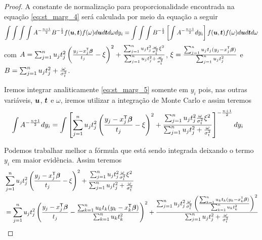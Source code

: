 \begin{proof}
A constante de normalização para proporcionalidade encontrada na equação \eqref{eq:st_marg_4} será calculada por meio da equação a seguir
\begin{equation}\label{eq:st_marg_5}
\int\int\int \int A^{-\frac{n-1}{2}} B^{-\frac{1}{2}} f({\boldsymbol{u}},{\boldsymbol{t}})f(\omega)d{\boldsymbol{u}} d{\boldsymbol{t}} d\omega d y_i  =  \int\int\int B^{-\frac{1}{2}}\left[ \int A^{-\frac{n-1}{2}}d y_i \right]f({\boldsymbol{u}},{\boldsymbol{t}})f(\omega)d{\boldsymbol{u}} d{\boldsymbol{t}} d\omega 
\end{equation}
com $A=\sum_{j=1}^nu_jt_j^2\left(\frac{y_j-x_j^{\mathsf{T}}{\boldsymbol{\beta}}}{t_j} - \xi\right)^2 + \frac{\sum_{j=1}^nu_jt_j^2\frac{\omega}{\sigma^2_t}\xi^2}{\sum_{j=1}^nu_jt_j^2+\frac{\omega}{\sigma^2_t}}$, $\xi = \frac{\sum_{j=1}^nu_jt_j(y_j-x_j^{\mathsf{T}}{\boldsymbol{\beta}})}{\sum_{j=1}^nu_jt_j^2}$ e $B=\sum_{j=1}^nu_jt_j^2+\frac{\omega}{\sigma^2_t}$.

Iremos integrar analiticamente \eqref{eq:st_marg_5} somente em $y_i$ pois, nas outras variáveis, ${\boldsymbol{u}}$, ${\boldsymbol{t}}$ e $\omega$, iremos utilizar a integração de Monte Carlo e assim teremos
\begin{equation}
\begin{split}
\int A^{-\frac{n+1}{2}} d y_i  &= \int \left[\sum_{j=1}^nu_jt_j^2\left(\frac{y_j-x_j^{\mathsf{T}}{\boldsymbol{\beta}}}{t_j} - \xi\right)^2 + \frac{\sum_{j=1}^nu_jt_j^2\frac{\omega}{\sigma^2_t}\xi^2}{\sum_{j=1}^nu_jt_j^2+\frac{\omega}{\sigma^2_t}}\right]^{-\frac{n+1}{2}}d y_i
\end{split}
\end{equation}

Podemos trabalhar melhor a fórmula que está sendo integrada deixando o termo $y_i$ em maior evidência. Assim teremos
\begin{equation}
\begin{split}
& \sum_{j=1}^nu_jt_j^2\left(\frac{y_j-x_j^{\mathsf{T}}{\boldsymbol{\beta}}}{t_j} - \xi\right)^2 + \frac{\sum_{j=1}^nu_jt_j^2\frac{\omega}{\sigma^2_t}\xi^2}{\sum_{j=1}^nu_jt_j^2+\frac{\omega}{\sigma^2_t}} \\
& = \sum_{j=1}^nu_jt_j^2\left(\frac{y_j-x_j^{\mathsf{T}}{\boldsymbol{\beta}}}{t_j} - \frac{\sum_{k=1}^nu_kt_k(y_k-x_k^{\mathsf{T}}{\boldsymbol{\beta}})}{\sum_{k=1}^nu_kt_k^2}\right)^2 + \frac{\sum_{j=1}^nu_jt_j^2\frac{\omega}{\sigma^2_t}\left(\frac{\sum_{k=1}^nu_kt_k(y_k-x_k^{\mathsf{T}}{\boldsymbol{\beta}})}{\sum_{k=1}^nu_kt_k^2}\right)^2}{\sum_{j=1}^nu_jt_j^2+\frac{\omega}{\sigma^2_t}}
\end{split}
\end{equation}


\end{proof}
